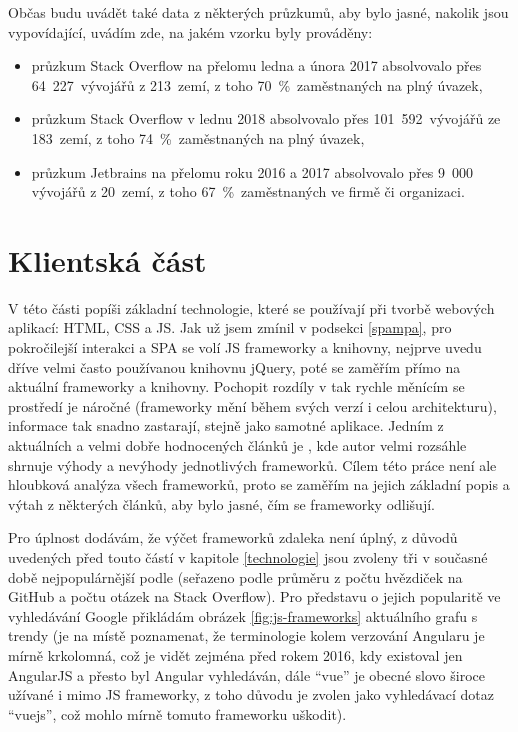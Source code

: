 Občas budu uvádět také data z některých průzkumů, aby bylo jasné, nakolik jsou vypovídající, uvádím zde, na jakém vzorku byly prováděny:
\begin{itemize}
    \item průzkum Stack Overflow \cite{stack-stats17} na přelomu ledna a února 2017 absolvovalo přes 64~227~vývojářů z 213~zemí, z toho 70~\%~zaměstnaných na plný úvazek,
    \item průzkum Stack Overflow \cite{stack-stats18} v lednu 2018 absolvovalo přes 101~592~vývojářů ze 183~zemí, z toho 74~\%~zaměstnaných na plný úvazek,
    \item průzkum Jetbrains \cite{jetbrains-stats} na přelomu roku 2016 a 2017 absolvovalo přes 9~000 vývojářů z 20~zemí, z toho 67~\%~zaměstnaných ve firmě či organizaci.
\end{itemize}

    \section{Klientská část}
    V této části popíši základní technologie, které se používají při tvorbě webových aplikací: HTML, CSS a JS. Jak už jsem zmínil v podsekci \ref{spampa}, pro pokročilejší interakci a SPA se volí JS frameworky a knihovny, nejprve uvedu dříve velmi často používanou knihovnu jQuery, poté se zaměřím přímo na aktuální frameworky a knihovny. Pochopit rozdíly v tak rychle měnícím se prostředí je náročné (frameworky mění během svých verzí i celou architekturu), informace tak snadno zastarají, stejně jako samotné aplikace. Jedním z aktuálních a velmi dobře hodnocených článků je \cite{js-fw2}, kde autor velmi rozsáhle shrnuje výhody a nevýhody jednotlivých frameworků. Cílem této práce není ale hloubková analýza všech frameworků, proto se zaměřím na jejich základní popis a výtah z některých článků, aby bylo jasné, čím se frameworky odlišují.
    
    Pro úplnost dodávám, že výčet frameworků zdaleka není úplný, z důvodů uvedených před touto částí v kapitole \ref{technologie} jsou zvoleny tři v současné době nejpopulárnější podle \cite{hot-frameworks} (seřazeno podle průměru z počtu hvězdiček na GitHub a počtu otázek na Stack Overflow). Pro představu o jejich popularitě ve vyhledávání Google přikládám obrázek \ref{fig:js-frameworks} aktuálního grafu s trendy (je na místě poznamenat, že terminologie kolem verzování Angularu je mírně krkolomná, což je vidět zejména před rokem 2016, kdy existoval jen AngularJS a přesto byl Angular vyhledáván, dále \enquote{vue} je obecné slovo široce užívané i mimo JS frameworky, z toho důvodu je zvolen jako vyhledávací dotaz \enquote{vuejs}, což mohlo mírně tomuto frameworku uškodit).
    
